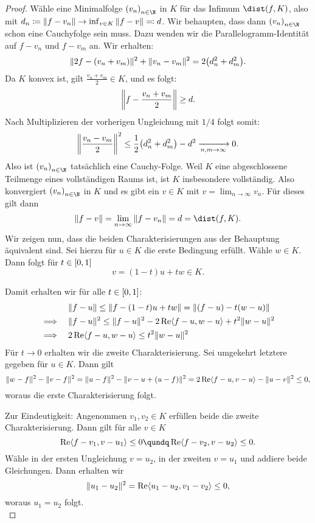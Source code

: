 \begin{proof}
    Wähle eine Minimalfolge $\nSeq v$ in $K$ für das Infimum $\dist(f,K)$, also
    mit $d_n \defeq \norm{f-v_n} \to \inf_{v\in K} \,\norm{f-v} \eqdef d$. Wir
    behaupten, dass dann $\nSeq v$ schon eine Cauchyfolge sein muss. Dazu
    wenden wir die Parallelogramm-Identität
     auf $f-v_n$ und $f-v_m$ an.
    Wir erhalten:
    \[ \norm{ 2f-(v_n+v_m)}^2 + \norm{v_n-v_m}^2 = 2 \bigl(d_n^2 + d_m^2\bigr)
    . \]
    Da $K$ konvex ist, gilt $\frac{v_n+v_m}{2} \in K$, und es folgt:
    \[ \norm*{f-\frac{v_n+v_m}{2}} \geq d  . \]
    Nach Multiplizieren der vorherigen Ungleichung mit $1/4$ folgt somit:
    \[ \norm*{\frac{v_n-v_m}{2}}^2 \leq \half \bigl(d_n^2+d_m^2\bigr) - d^2
        \Xtoinfty{n,m} 0
    . \]
    Also ist $\nSeq v$ tatsächlich eine Cauchy-Folge. Weil $K$ eine
    abgeschlossene Teilmenge eines vollständigen Raums ist, ist $K$ insbesondere
    vollständig. Also konvergiert $\nSeq v$ in $K$ und es gibt ein $v\in K$ mit
    $v = \lim_{n\to\infty} v_n$. Für dieses gilt dann
    \[ \norm{f-v} = \lim_{n\to\infty} \, \norm{f-v_n} = d = \dist(f,K) . \]
    Wir zeigen nun, dass die beiden Charakterisierungen aus der Behauptung
    äquivalent sind. Sei hierzu für $u\in K$ die erste Bedingung erfüllt. Wähle
    $w\in K$. Dann folgt für $t\in\I$
    \[ v = (1-t) u + tw \in K  . \]

    Damit erhalten wir für alle $t\in\I$:
    \begin{align*}
        &\norm{f-u} \leq \norm{f-(1-t)u+tw} = \norm{(f-u)-t(w-u)}
        \\
        \implies\quad&
        \norm{f-u}^2 \leq \norm{f-u}^2 - 2\Re\SP{f-u,w-u} + t^2\norm{w-u}^2
        \\
        \implies\quad&
        2\Re\SP{f-u,w-u} \leq t^2 \norm{w-u}^2
    \end{align*}
    Für $t\to 0$ erhalten wir die zweite Charakterisierung. Sei umgekehrt
    letztere gegeben für $u\in K$. Dann gilt
    \[ \norm{w-f}^2 - \norm{v-f}^2 = \norm{u-f}^2 - \norm{v-u+(u-f)}^2
        = 2\Re\SP{f-u,v-u} - \norm{u-v}^2 \leq 0
    , \]
    woraus die erste Charakterisierung folgt.
    
    Zur Eindeutigkeit: Angenommen $v_1,v_2\in K$ erfüllen beide die zweite
    Charakterisierung. Dann gilt für alle $v\in K$
    \[ \Re\SP{f-v_1,v-u_1} \leq 0   \qundq 
        \Re\SP{f-v_2,v-u_2} \leq 0
    . \]
    Wähle in der ersten Ungleichung $v=u_2$, in der zweiten $v=u_1$ und addiere
    beide Gleichungen. Dann erhalten wir
    \[ \norm{u_1-u_2}^2 = \Re\SP{u_1-u_2,v_1-v_2}  \leq 0  , \]
    woraus $u_1=u_2$ folgt.
    \\
\end{proof}

